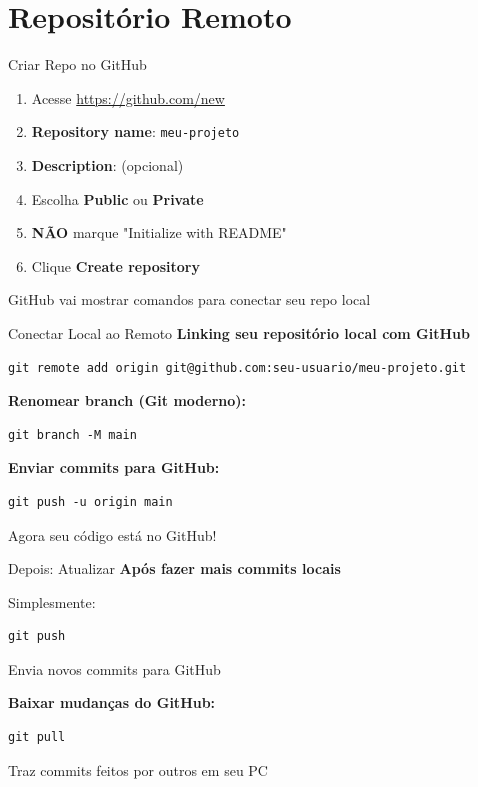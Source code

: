 \documentclass[11pt]{beamer}
\begin{document}
\section{Repositório Remoto}

\begin{frame}{Criar Repo no GitHub}
\begin{enumerate}
    \item Acesse \url{https://github.com/new}
    \item \textbf{Repository name}: \texttt{meu-projeto}
    \item \textbf{Description}: (opcional)
    \item Escolha \textbf{Public} ou \textbf{Private}
    \item \textbf{NÃO} marque "Initialize with README"
    \item Clique \textbf{Create repository}
\end{enumerate}

\vspace{0.3cm}

GitHub vai mostrar comandos para conectar seu repo local
\end{frame}

\begin{frame}{Conectar Local ao Remoto}
\textbf{Linking seu repositório local com GitHub}

\begin{lstlisting}
git remote add origin git@github.com:seu-usuario/meu-projeto.git
\end{lstlisting}

\textbf{Renomear branch (Git moderno):}
\begin{lstlisting}
git branch -M main
\end{lstlisting}

\textbf{Enviar commits para GitHub:}
\begin{lstlisting}
git push -u origin main
\end{lstlisting}

\vspace{0.3cm}

Agora seu código está no GitHub! 🎉
\end{frame}

\begin{frame}{Depois: Atualizar}
\textbf{Após fazer mais commits locais}

Simplesmente:
\begin{lstlisting}
git push
\end{lstlisting}

Envia novos commits para GitHub

\vspace{0.5cm}

\textbf{Baixar mudanças do GitHub:}
\begin{lstlisting}
git pull
\end{lstlisting}

Traz commits feitos por outros em seu PC
\end{frame}
\end{document}
